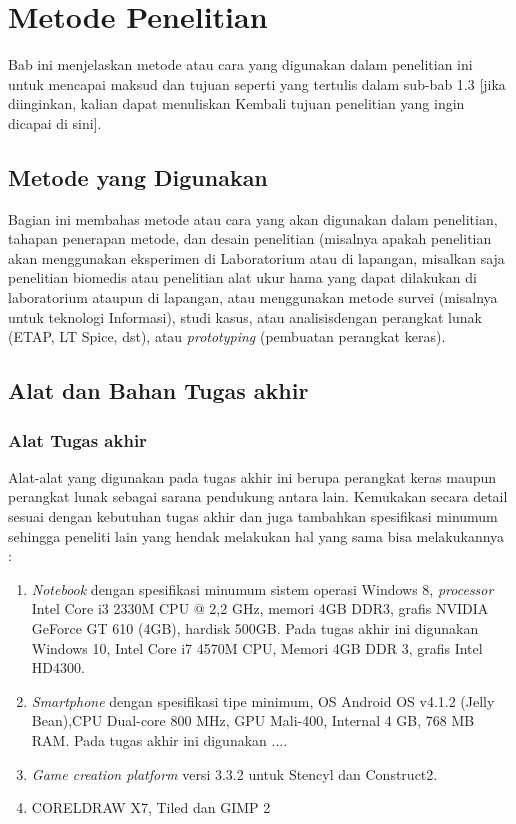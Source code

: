 \chapter{Metode Penelitian}

Bab ini menjelaskan metode atau cara yang digunakan dalam penelitian ini untuk 
mencapai maksud dan tujuan seperti yang tertulis dalam sub-bab 1.3 [jika diinginkan, kalian dapat menuliskan Kembali tujuan penelitian yang ingin dicapai di sini].

\section{Metode yang Digunakan}

Bagian ini membahas metode atau cara yang akan digunakan dalam penelitian, tahapan 
penerapan metode, dan desain penelitian (misalnya apakah penelitian akan menggunakan 
eksperimen di Laboratorium atau di lapangan, misalkan saja penelitian biomedis atau 
penelitian alat ukur hama yang dapat dilakukan di laboratorium ataupun di lapangan, atau menggunakan metode survei (misalnya untuk teknologi Informasi), studi kasus, atau analisisdengan perangkat lunak (ETAP, LT Spice, dst), atau \textit{prototyping} (pembuatan perangkat keras).

\section{Alat dan Bahan Tugas akhir}

\subsection*{Alat Tugas akhir}

Alat-alat yang digunakan pada tugas akhir ini berupa perangkat keras maupun perangkat lunak sebagai sarana pendukung antara lain. Kemukakan secara detail sesuai dengan kebutuhan tugas akhir dan juga tambahkan spesifikasi minumum sehingga peneliti lain yang hendak melakukan hal yang sama bisa melakukannya :

\begin{enumerate}
\item \textit{Notebook} dengan spesifikasi minumum sistem operasi Windows 8, \textit{processor} Intel Core i3 2330M CPU @ 2,2 GHz, memori 4GB DDR3, grafis NVIDIA GeForce GT 610 (4GB), hardisk 500GB. Pada tugas akhir ini digunakan Windows 10, Intel Core i7 4570M CPU, Memori 4GB DDR 3, grafis Intel HD4300. 
\item \textit{Smartphone} dengan spesifikasi tipe minimum, OS Android OS v4.1.2 (Jelly Bean),CPU Dual-core 800 MHz, GPU Mali-400, Internal 4 GB, 768 MB RAM. Pada tugas akhir ini digunakan ....
\item \textit{Game creation platform} versi 3.3.2 untuk Stencyl dan Construct2.
\item CORELDRAW X7, Tiled dan GIMP 2
\end{enumerate}

